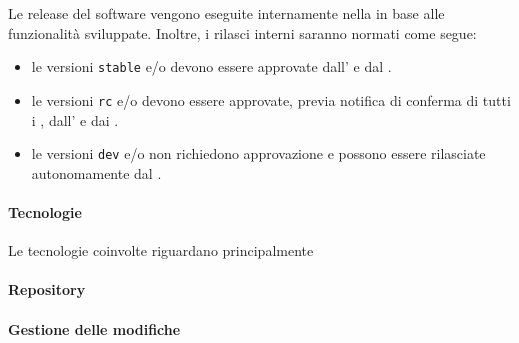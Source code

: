 		Le release del software vengono eseguite internamente nella  in base alle funzionalità sviluppate. Inoltre, i rilasci interni saranno normati come segue:
		\begin{itemize}
			\item le versioni \verb!stable! e/o  devono essere approvate dall' e dal .
			\item le versioni \verb!rc! e/o  devono essere approvate, previa notifica di conferma di tutti i , dall' e dai .
			\item le versioni \verb!dev! e/o  non richiedono approvazione e possono essere rilasciate autonomamente dal .
		\end{itemize}


		\paragraph{Tecnologie}

		Le tecnologie coinvolte riguardano principalmente 

		\paragraph{Repository}
			
		\paragraph{Gestione delle modifiche}

	